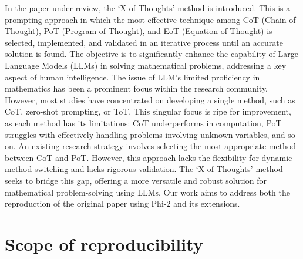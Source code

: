 \documentclass[10pt]{article} %
\begin{document}
In the paper under review, the `X-of-Thoughts' method is introduced. This is a prompting approach in which the most effective technique among CoT (Chain of Thought), PoT (Program of Thought), and EoT (Equation of Thought) is selected, implemented, and validated in an iterative process until an accurate solution is found. 
The objective is to significantly enhance the capability of Large Language Models (LLMs) in solving mathematical problems, addressing a key aspect of human intelligence. The issue of LLM's limited proficiency in mathematics has been a prominent focus within the research community. However, most studies have concentrated on developing a single method, such as CoT, zero-shot prompting, or ToT. This singular focus is ripe for improvement, as each method has its limitations: CoT underperforms in computation, PoT struggles with effectively handling problems involving unknown variables, and so on. 
An existing research strategy involves selecting the most appropriate method between CoT and PoT. However, this approach lacks the flexibility for dynamic method switching and lacks rigorous validation. The `X-of-Thoughts' method seeks to bridge this gap, offering a more versatile and robust solution for mathematical problem-solving using LLMs. 
Our work aims to address both the reproduction of the original paper using Phi-2 and its extensions.





\section{Scope of reproducibility}
\label{gen_inst}
\end{document}
